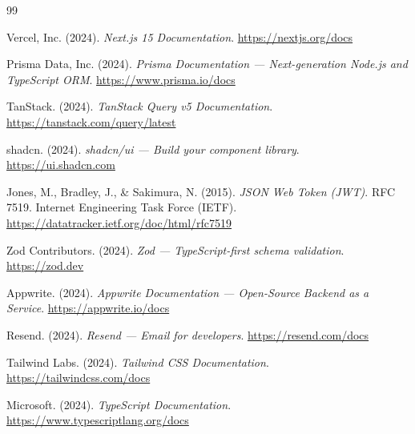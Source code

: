 \begin{thebibliography}{99}

Vercel, Inc. (2024). \textit{Next.js 15 Documentation}. \url{https://nextjs.org/docs}

Prisma Data, Inc. (2024). \textit{Prisma Documentation — Next-generation Node.js and TypeScript ORM}. \url{https://www.prisma.io/docs}

TanStack. (2024). \textit{TanStack Query v5 Documentation}. \url{https://tanstack.com/query/latest}

shadcn. (2024). \textit{shadcn/ui — Build your component library}. \url{https://ui.shadcn.com}

Jones, M., Bradley, J., \& Sakimura, N. (2015). \textit{JSON Web Token (JWT)}. RFC 7519. Internet Engineering Task Force (IETF). \url{https://datatracker.ietf.org/doc/html/rfc7519}

Zod Contributors. (2024). \textit{Zod — TypeScript-first schema validation}. \url{https://zod.dev}

Appwrite. (2024). \textit{Appwrite Documentation — Open-Source Backend as a Service}. \url{https://appwrite.io/docs}

Resend. (2024). \textit{Resend — Email for developers}. \url{https://resend.com/docs}

Tailwind Labs. (2024). \textit{Tailwind CSS Documentation}. \url{https://tailwindcss.com/docs}

Microsoft. (2024). \textit{TypeScript Documentation}. \url{https://www.typescriptlang.org/docs}

\end{thebibliography}
